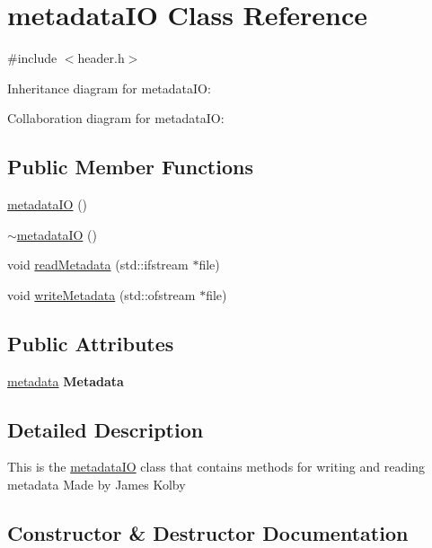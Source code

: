 \hypertarget{classmetadataIO}{}\section{metadata\+IO Class Reference}
\label{classmetadataIO}


{\ttfamily \#include $<$header.\+h$>$}



Inheritance diagram for metadata\+IO\+:


Collaboration diagram for metadata\+IO\+:
\subsection*{Public Member Functions}
\begin{DoxyCompactItemize}
\item 
\hyperlink{classmetadataIO_a7bae61f34e6eded4be31fce1142c91b3}{metadata\+IO} ()
\item 
\hyperlink{classmetadataIO_afe6677b6e0070294bd78aef91a14c381}{$\sim$metadata\+IO} ()
\item 
void \hyperlink{classmetadataIO_a453fa191b3706e946f6b63c82ee5741b}{read\+Metadata} (std\+::ifstream $\ast$file)
\item 
void \hyperlink{classmetadataIO_a25d23857ece64de3a376fa9f26d66577}{write\+Metadata} (std\+::ofstream $\ast$file)
\end{DoxyCompactItemize}
\subsection*{Public Attributes}
\begin{DoxyCompactItemize}
\item 
\mbox{\label{classmetadataIO_abaf6723a80198627adae99992e0e2fef}} 
\hyperlink{structmetadata}{metadata} {\bfseries Metadata}
\end{DoxyCompactItemize}


\subsection{Detailed Description}
This is the \hyperlink{classmetadataIO}{metadata\+IO} class that contains methods for writing and reading metadata Made by James Kolby 

\subsection{Constructor \& Destructor Documentation}
\mbox{\label{classmetadataIO_a7bae61f34e6eded4be31fce1142c91b3}} 
